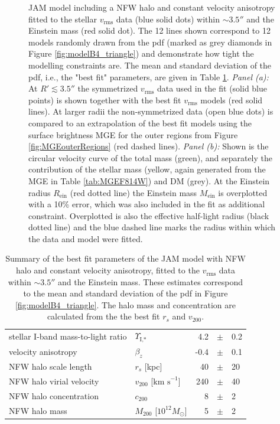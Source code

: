 \documentclass[useAMS,usenatbib]{mnras}
\begin{document}
\begin{figure}
\begin{subfigure}{.48\textwidth}
  \label{fig:modelB4_enclMass}
\end{subfigure}
\caption{JAM model including a NFW halo and constant velocity anisotropy fitted to the stellar $v_\text{rms}$ data (blue solid dots) within $\sim3.5''$ and the Einstein mass (red solid dot). The 12 lines shown correspond to 12 models randomly drawn from the pdf (marked as grey diamonds in Figure \ref{fig:modelB4_triangle}) and demonstrate how tight the modelling constraints are. The mean and standard deviation of the pdf, i.e., the "best fit" parameters, are given in Table \ref{tab:modelB4_bestfit}. \emph{Panel (a):} At $R'\lesssim 3.5''$ the symmetrized $v_\text{rms}$ data used in the fit (solid blue points) is shown together with the best fit $v_\text{rms}$ models (red solid lines). At larger radii the non-symmetrized data (open blue dots) is compared to an extrapolation of the best fit models using the surface brightness MGE for the outer regions from Figure \ref{fig:MGEouterRegions} (red dashed lines). \emph{Panel (b):} Shown is the circular velocity curve of the total mass (green), and separately the contribution of the stellar mass (yellow, again generated from the MGE in Table \ref{tab:MGEF814W}) and DM (grey). At the Einstein radius $R_\text{ein}$ (red dotted line) the Einstein mass $M_\text{ein}$ is overplotted with a 10\% error, which was also included in the fit as additional constraint. Overplotted is also the effective half-light radius (black dotted line) and the blue dashed line marks the radius within which the data and model were fitted.}
\label{fig:modelB4_models}
\end{figure}

\begin{table}
\centering
\begin{tabular}{llrcl}
\hline
stellar I-band mass-to-light ratio & $\Upsilon_\text{I,*}$ & 4.2 & $\pm$ & 0.2\\
velocity anisotropy & $\beta_z$ & -0.4 & $\pm$ & 0.1 \\
NFW halo scale length & $r_s$ [kpc] & 40 & $\pm$ & 20\\
NFW halo virial velocity & $v_{200}$ [$\text{km s}^{-1}$] & 240 & $\pm$ & 40\\
NFW halo concentration & $c_{200}$ & 8 & $\pm$ & 2 \\
NFW halo mass & $M_{200}$ [$10^{12} M_\odot$] & 5 & $\pm$ & 2\\
\hline
\end{tabular}
\caption{Summary of the best fit parameters of the JAM model with NFW halo and constant velocity anisotropy, fitted to the $v_\text{rms}$ data within $\sim 3.5''$ and the Einstein mass. These estimates correspond to the mean and standard deviation of the pdf in Figure \ref{fig:modelB4_triangle}. The halo mass and concentration are calculated from the the best fit $r_s$ and $v_{200}$.}
\label{tab:modelB4_bestfit}
\end{table}
\end{document}
